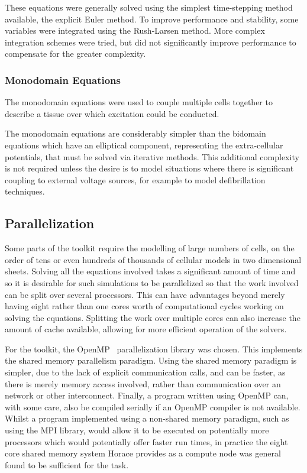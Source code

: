 These equations were generally solved using the simplest time-stepping method
available, the explicit Euler method.  To improve performance and stability,
some variables were integrated using the Rush-Larsen method.  More complex
integration schemes were tried, but did not significantly improve performance to
compensate for the greater complexity.

\subsubsection{Monodomain Equations}

The monodomain equations were used to couple multiple cells together to describe
a tissue over which excitation could be conducted.



The monodomain equations are considerably simpler than the bidomain equations
which have an elliptical component, representing the extra-cellular potentials,
that must be solved via iterative methods.  This additional complexity is not
required unless the desire is to model situations where there is significant
coupling to external voltage sources, for example to model defibrillation
techniques.

\subsection{Parallelization}

Some parts of the toolkit require the modelling of large numbers of cells, on
the order of tens or even hundreds of thousands of cellular models in two
dimensional sheets.  Solving all the equations involved takes a significant
amount of time and so it is desirable for such simulations to be parallelized so
that the work involved can be split over several processors.  This can have
advantages beyond merely having eight rather than one cores worth of
computational cycles working on solving the equations.  Splitting the work over
multiple cores can also increase the amount of cache available, allowing for
more efficient operation of the solvers.

For the toolkit, the OpenMP~\cite{OpenMP} parallelization library was chosen.
This implements the shared memory parallelism paradigm.  Using the shared memory
paradigm is simpler, due to the lack of explicit communication calls, and can be
faster, as there is merely memory access involved, rather than communication
over an network or other interconnect.  Finally, a program written using OpenMP
can, with some care, also be compiled serially if an OpenMP compiler is not
available.  Whilst a program implemented using a non-shared memory paradigm,
such as using the MPI library, would allow it to be executed on potentially more
processors which would potentially offer faster run times, in practice the eight
core shared memory system Horace provides as a compute node was general found to
be sufficient for the task.

